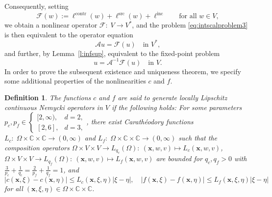 \documentclass[12pt,DIV=14]{scrartcl}
\newtheorem{definition}{Definition}
\providecommand{\C}{\mathbb{C}}
\providecommand{\Om}{\Omega}
\providecommand{\vecx}{\boldsymbol{x}}
\begin{document}
Consequently, setting
\[
\mathcal{F}(w) := \ell^\mathrm{contr}(w) + \ell^\mathrm{src}(w) + \ell^\mathrm{inc}
\qquad\text{for all }
w\in V,
\]
we obtain a nonlinear operator $\mathcal{F}:\; V \to V^\ast$,
and the problem \eqref{eq:intscalproblem3} is then equivalent to the operator equation
\[
\mathcal{A} u = \mathcal{F}(u)
\quad\text{in } V^\ast,
\]
and further, by Lemma~\ref{l:infsup}, equivalent to the fixed-point problem
\begin{equation}\label{eq:scalfpp}
u = \mathcal{A}^{-1} \mathcal{F}(u)
\quad\text{in } V.
\end{equation}
In order to prove the subsequent existence and uniqueness theorem, we specify
some additional properties of the nonlinearities $c$ and $f$.
\begin{definition}\label{def:loclip}
The functions $c$ and $f$ are said to generate locally Lipschitz continuous
Nemycki operators in $V$ if the following holds: For some parameters
$p_c,p_f\in\begin{cases}
[2,\infty), & d=2,\\
[2,6], & d=3,
\end{cases}$,
there exist Carath\'{e}odory functions
$L_c:\;\Om\times\C\times\C\to(0,\infty)$ and $L_f:\;\Om\times\C\times\C\to(0,\infty)$
such that the composition operators
$\Om\times V\times V\to L_{q_c}(\Om):\:(\vecx,w,v)\mapsto L_c(\vecx,w,v)$,
$\Om\times V\times V\to L_{q_f}(\Om):\:(\vecx,w,v)\mapsto L_f(\vecx,w,v)$
are bounded for $q_c,q_f>0$ with
$\frac{3}{p_c}+\frac{1}{q_c}=\frac{2}{p_f}+\frac{1}{q_f}=1$,
and
\[
|c(\vecx,\xi)-c(\vecx,\eta)| \le L_c(\vecx,\xi,\eta) |\xi-\eta|,
\quad
|f(\vecx,\xi)-f(\vecx,\eta)| \le L_f(\vecx,\xi,\eta) |\xi-\eta|
\]
for all $(\vecx,\xi,\eta)\in\Om\times\C\times\C$.
\end{definition}
\end{document}
